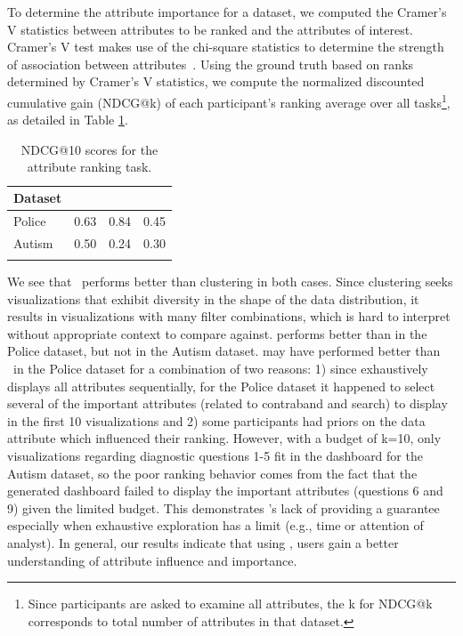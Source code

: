 To determine the attribute importance for a dataset, we computed the Cramer's V statistics between attributes to be ranked and the attributes of interest. Cramer's V test makes use of the chi-square statistics to determine the strength of association between attributes~\cite{McHugh2013}. Using the ground truth based on ranks determined by Cramer's V statistics, we compute the normalized discounted cumulative gain (NDCG@k) of each participant's ranking average over all tasks\footnote{Since participants are asked to examine all attributes, the k for NDCG@k corresponds to total number of attributes in that dataset.}, as detailed in Table \ref{table:ndcgRankingResult}.
\begin{table}[ht!]
	\centering
	\begin{tabular}{lrrr}
	\hline
	 Dataset   &   \system &  \BFS &  \cluster   \\
	\hline
	 Police    &      0.63 &       \cellcolor{blue!25}0.84 &  0.45 \\
	 Autism    &      \cellcolor{blue!25}0.50 &       0.24&0.30   \\
	\hline
	\label{table:ndcg_ranking_result}
	\end{tabular}
	\caption{NDCG@10 scores for the attribute ranking task.}
	\vspace{-20pt}
    \label{table:ndcgRankingResult}
\end{table}
We see that \system\ performs better than clustering in both cases. Since clustering seeks visualizations that exhibit diversity in the shape of the data distribution, it results in visualizations with many filter combinations, which is hard to interpret without appropriate context to compare against. \BFS performs better than \system in the Police dataset, but not in the Autism dataset. \BFS may have performed better than \system\ in the Police dataset for a combination of two reasons: 1) since \BFS exhaustively displays all attributes sequentially, for the Police dataset it happened to select several of the important attributes (related to contraband and search) to display in the first 10 visualizations and 2) some participants had priors on the data attribute which influenced their ranking. However, with a budget of k=10, only visualizations regarding diagnostic questions 1-5 fit in the dashboard for the Autism dataset, so the poor ranking behavior comes from the fact that the \BFS generated dashboard failed to display the important attributes (questions 6 and 9) given the limited budget. This demonstrates \BFS's lack of providing a guarantee especially when exhaustive exploration has a limit (e.g., time or attention of analyst). In general, our results indicate that using \system, users gain a better understanding of attribute influence and importance.
